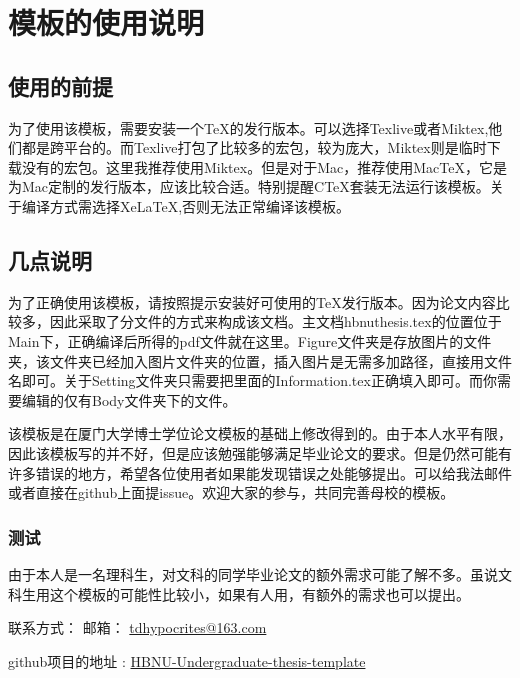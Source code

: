 \chapter{模板的使用说明}
\section{使用的前提}
为了使用该模板，需要安装一个TeX的发行版本。可以选择Texlive或者Miktex,他们都是跨平台的。而Texlive打包了比较多的宏包，较为庞大，Miktex则是临时下载没有的宏包。这里我推荐使用Miktex。但是对于Mac，推荐使用MacTeX，它是为Mac定制的发行版本，应该比较合适。特别提醒CTeX套装无法运行该模板。关于编译方式需选择XeLaTeX,否则无法正常编译该模板。


\section{几点说明}

为了正确使用该模板，请按照提示安装好可使用的TeX发行版本。因为论文内容比较多，因此采取了分文件的方式来构成该文档。主文档hbnuthesis.tex的位置位于Main下，正确编译后所得的pdf文件就在这里。Figure文件夹是存放图片的文件夹，该文件夹已经加入图片文件夹的位置，插入图片是无需多加路径，直接用文件名即可。关于Setting文件夹只需要把里面的Information.tex正确填入即可。而你需要编辑的仅有Body文件夹下的文件。

该模板是在厦门大学博士学位论文模板的基础上修改得到的。由于本人水平有限，因此该模板写的并不好，但是应该勉强能够满足毕业论文的要求。但是仍然可能有许多错误的地方，希望各位使用者如果能发现错误之处能够提出。可以给我法邮件或者直接在github上面提issue。欢迎大家的参与，共同完善母校的模板。
\subsection{测试}
由于本人是一名理科生，对文科的同学毕业论文的额外需求可能了解不多。虽说文科生用这个模板的可能性比较小，如果有人用，有额外的需求也可以提出。

联系方式：
邮箱： \href{mailto:tdypocrites@163.com}{tdhypocrites@163.com}

github项目的地址 : \href{https://github.com/TDHypocrites/HBNU-Undergraduate-thesis-template}{HBNU-Undergraduate-thesis-template}
